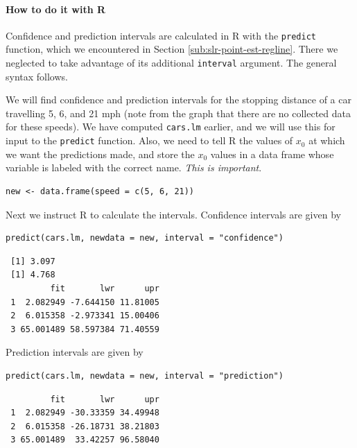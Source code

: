 \documentclass[captions=tableheading]{scrbook}
\begin{document}
\paragraph*{How to do it with \textsf{R}}

Confidence and prediction intervals are calculated in \textsf{R} with the \texttt{predict} function, which we encountered in Section \ref{sub:slr-point-est-regline}. There we neglected to take advantage of its additional \texttt{interval} argument. The general syntax follows. 

\begin{example}
We will find confidence and prediction intervals for the stopping distance of a car travelling 5, 6, and 21 mph (note from the graph that there are no collected data for these speeds). We have computed \texttt{cars.lm} earlier, and we will use this for input to the \texttt{predict} function. Also, we need to tell \textsf{R} the values of \(x_{0}\) at which we want the predictions made, and store the \(x_{0}\) values in a data frame whose variable is labeled with the correct name. \emph{This is important}. 


\begin{verbatim}
new <- data.frame(speed = c(5, 6, 21))
\end{verbatim}

Next we instruct \textsf{R} to calculate the intervals. Confidence intervals are given by 


\begin{verbatim}
predict(cars.lm, newdata = new, interval = "confidence")
\end{verbatim}

\begin{verbatim}
 [1] 3.097
 [1] 4.768
         fit       lwr      upr
 1  2.082949 -7.644150 11.81005
 2  6.015358 -2.973341 15.00406
 3 65.001489 58.597384 71.40559
\end{verbatim}



Prediction intervals are given by


\begin{verbatim}
predict(cars.lm, newdata = new, interval = "prediction")
\end{verbatim}

\begin{verbatim}
         fit       lwr      upr
 1  2.082949 -30.33359 34.49948
 2  6.015358 -26.18731 38.21803
 3 65.001489  33.42257 96.58040
\end{verbatim}



\end{example}
\end{document}
